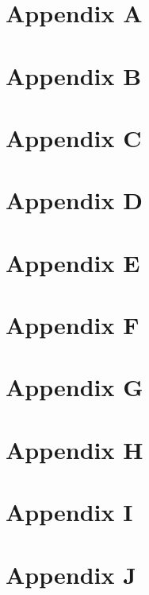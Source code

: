 
\appendix

\chapter{Appendix A}

\chapter{Appendix B}

\chapter{Appendix C}

\chapter{Appendix D}

\chapter{Appendix E}

\chapter{Appendix F}

\chapter{Appendix G}

\chapter{Appendix H}

\chapter{Appendix I}

\chapter{Appendix J}

